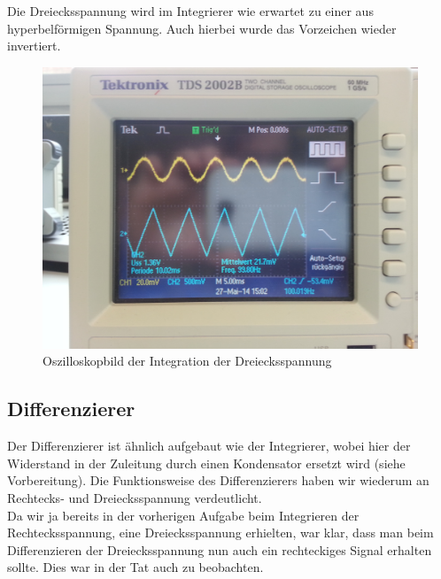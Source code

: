\documentclass[a4paper,titlepage]{scrartcl}
\numberwithin{equation}{section}
\begin{document}
Die Dreiecksspannung wird im Integrierer wie erwartet zu einer aus hyperbelförmigen Spannung. Auch hierbei wurde das Vorzeichen wieder invertiert.

\begin{figure}[H]
\centering
\includegraphics[scale=.08]{bilder/aufgabe_3_3_2.jpg} 
\caption{Oszilloskopbild der Integration der Dreiecksspannung}
\end{figure}

\subsection{Differenzierer}

Der Differenzierer ist ähnlich aufgebaut wie der Integrierer, wobei hier der Widerstand in der Zuleitung durch einen Kondensator ersetzt wird (siehe Vorbereitung). Die Funktionsweise des Differenzierers haben wir wiederum an Rechtecks- und Dreiecksspannung verdeutlicht.\\
Da wir ja bereits in der vorherigen Aufgabe beim Integrieren der Rechtecksspannung, eine Dreiecksspannung erhielten, war klar, dass man beim Differenzieren der Dreiecksspannung nun auch ein rechteckiges Signal erhalten sollte. Dies war in der Tat auch zu beobachten.
\end{document}
